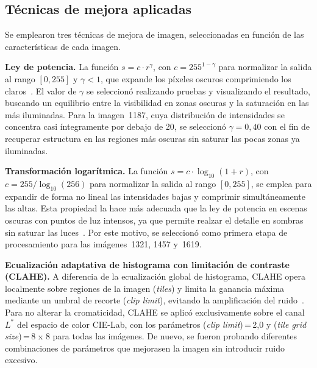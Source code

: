 \documentclass[12pt,a4paper,twoside]{rho-class/rho}
\begin{document}
    \subsection{Técnicas de mejora aplicadas}

        Se emplearon tres técnicas de mejora de imagen, seleccionadas en función de
        las características de cada imagen.

        \textbf{Ley de potencia.} La función
        $s = c \cdot r^{\gamma}$, con $c = 255^{1-\gamma}$ para normalizar la
        salida al rango $[0, 255]$ y $\gamma < 1$, que expande los píxeles oscuros
        comprimiendo los claros~\parencite{huang2013agcwd}. El valor de $\gamma$ se seleccionó realizando pruebas y visualizando el resultado, buscando un equilibrio entre la visibilidad en zonas oscuras y la saturación en las más iluminadas.
        Para la imagen~1187, cuya distribución de
        intensidades se concentra casi íntegramente por debajo de 20, se
        seleccionó $\gamma = 0{,}40$ con el fin de recuperar estructura en las
        regiones más oscuras sin saturar las pocas zonas ya iluminadas.

        \textbf{Transformación logarítmica.} La función
        $s = c \cdot \log_{10}(1 + r)$, con $c = 255 / \log_{10}(256)$ para
        normalizar la salida al rango $[0, 255]$, se emplea para expandir de 
        forma no lineal las intensidades bajas y comprimir simultáneamente las altas. 
        Esta propiedad la hace más adecuada que la ley de potencia en escenas oscuras 
        con puntos de luz intensos, ya que permite realzar el detalle en 
        sombras sin saturar las luces~\parencite{drago2003logmapping}. Por este motivo, se seleccionó como
        primera etapa de procesamiento para las imágenes~1321, 1457 y~1619.

        \textbf{Ecualización adaptativa de histograma con limitación de contraste
        (CLAHE).} A diferencia de la ecualización global de histograma, CLAHE
        opera localmente sobre regiones de la imagen (\textit{tiles}) y limita la
        ganancia máxima mediante un umbral de recorte (\textit{clip limit}),
        evitando la amplificación del ruido~\parencite{zuiderveld1994clahe}. Para no alterar la cromaticidad, CLAHE se
        aplicó exclusivamente sobre el canal~$L^*$ del espacio de color CIE-Lab,
        con los parámetros (\textit{clip limit})\,=\,2{,}0 y (\textit{tile grid size})\,=\,8 x 8 para
        todas las imágenes. De nuevo, se fueron probando diferentes combinaciones de parámetros que mejorasen la imagen sin introducir ruido excesivo.
\end{document}
